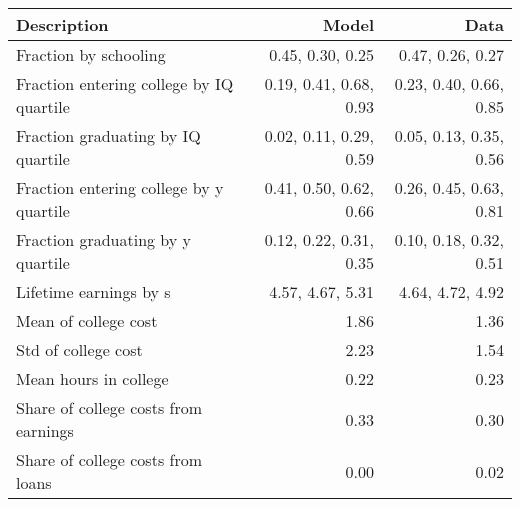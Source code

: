 \begin{tabular}{lrr}
\hline
Description & Model  & Data  \\
\hline
Fraction by schooling & 0.45, 0.30, 0.25  & 0.47, 0.26, 0.27  \\
Fraction entering college by IQ quartile & 0.19, 0.41, 0.68, 0.93  & 0.23, 0.40, 0.66, 0.85  \\
Fraction graduating by IQ quartile & 0.02, 0.11, 0.29, 0.59  & 0.05, 0.13, 0.35, 0.56  \\
Fraction entering college by y quartile & 0.41, 0.50, 0.62, 0.66  & 0.26, 0.45, 0.63, 0.81  \\
Fraction graduating by y quartile & 0.12, 0.22, 0.31, 0.35  & 0.10, 0.18, 0.32, 0.51  \\
Lifetime earnings by s & 4.57, 4.67, 5.31  & 4.64, 4.72, 4.92  \\
Mean of college cost & 1.86  & 1.36  \\
Std of college cost & 2.23  & 1.54  \\
Mean hours in college & 0.22  & 0.23  \\
Share of college costs from earnings & 0.33  & 0.30  \\
Share of college costs from loans & 0.00  & 0.02  \\
\hline
\end{tabular}%
